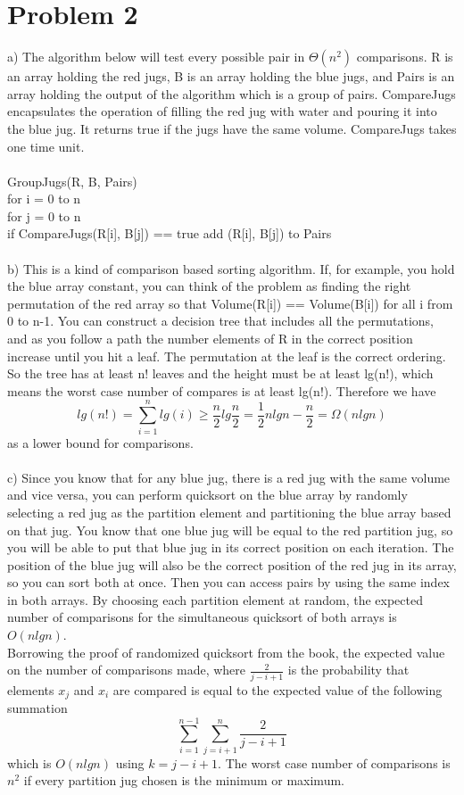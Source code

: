 \documentclass{article}
\begin{document}
\section*{Problem 2}
a) The algorithm below will test every possible pair in $\Theta(n^2)$ comparisons.  R is an array holding the red jugs, B is an array holding the blue jugs, and Pairs is an array holding the output of the algorithm which is a group of pairs.  CompareJugs encapsulates the operation of filling the red jug with water and pouring it into the blue jug.  It returns true if the jugs have the same volume. CompareJugs takes one time unit.\\\\
GroupJugs(R, B, Pairs)\\
\-\hspace{.5cm}for i = 0 to n\\
\-\hspace{1cm}for j = 0 to n\\
\-\hspace{1.5cm}if CompareJugs(R[i], B[j]) == true add (R[i], B[j]) to Pairs\\\\
b) This is a kind of comparison based sorting algorithm. If, for example, you hold the blue array constant, you can think of the problem as finding the right permutation of the red array so that Volume(R[i]) == Volume(B[i]) for all i from 0 to n-1.  You can construct a decision tree that includes all the permutations, and as you follow a path the number elements of R in the correct position increase until you hit a leaf.  The permutation at the leaf is the correct ordering.  So the tree has at least n! leaves and the height must be at least lg(n!), which means the worst case number of compares is at least lg(n!).  Therefore we have $$lg(n!) = \sum_{i=1}^n lg(i) \geq \frac{n}{2}lg\frac{n}{2} = \frac{1}{2}nlgn - \frac{n}{2} = \Omega(nlgn)$$ as a lower bound for comparisons.\\\\
c) Since you know that for any blue jug, there is a red jug with the same volume and vice versa, you can perform quicksort on the blue array by randomly selecting a red jug as the partition element and partitioning the blue array based on that jug.  You know that one blue jug will be equal to the red partition jug, so you will be able to put that blue jug in its correct position on each iteration. The position of the blue jug will also be the correct position of the red jug in its array, so you can sort both at once. Then you can access pairs by using the same index in both arrays. By choosing each partition element at random, the expected number of comparisons for the simultaneous quicksort of both arrays is $O(nlgn)$.\\ Borrowing the proof of randomized quicksort from the book, the expected value on the number of comparisons made, where $\frac{2}{j-i+1}$ is the probability that elements $x_j$ and $x_i$ are compared is equal to the expected value of the following summation $$\sum_{i=1}^{n-1}\sum_{j=i+1}^{n}\frac{2}{j-i+1}$$ which is $O(nlgn)$ using $k=j-i+1$.  The worst case number of comparisons is $n^2$ if every partition jug chosen is the minimum or maximum.\\
\end{document}
